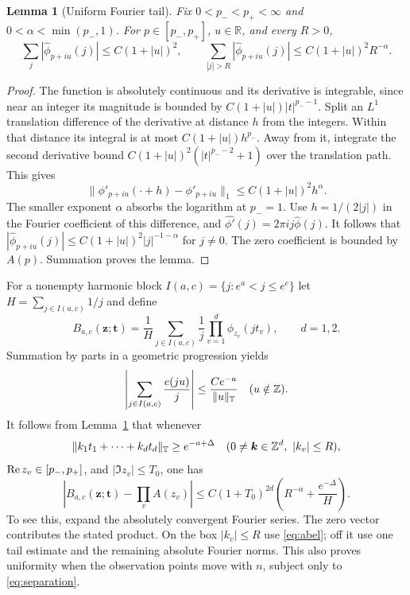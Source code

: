 \documentclass[11pt]{article}
\newtheorem{lemma}[theorem]{Lemma}
\theoremstyle{definition}\newtheorem{definition}[theorem]{Definition}
\theoremstyle{remark}\newtheorem{remark}[theorem]{Remark}
\newcommand{\T}{\mathbb T}\newcommand{\R}{\mathbb R}\newcommand{\C}{\mathbb C}
\numberwithin{equation}{section}\allowdisplaybreaks
\begin{document}
\begin{lemma}[Uniform Fourier tail]\label{lem:fourier}
Fix $0<p_-<p_+<\infty$ and $0<\alpha<\min(p_-,1)$. For
$p\in[p_-,p_+]$, $u\in\R$, and every $R>0$,
\begin{equation}\label{eq:fourier-tail}
 \sum_j|\widehat\phi_{p+iu}(j)|\le C(1+|u|)^2,
 \qquad
 \sum_{|j|>R}|\widehat\phi_{p+iu}(j)|
 \le C(1+|u|)^2 R^{-\alpha}.
\end{equation}
\end{lemma}
\begin{proof}
The function is absolutely continuous and its derivative is integrable,
since near an integer its magnitude is bounded by
$C(1+|u|)|t|^{p_--1}$. Split an $L^1$ translation difference of the
derivative at distance $h$ from the integers. Within that distance its
integral is at most $C(1+|u|)h^{p_-}$. Away from it, integrate the second
derivative bound $C(1+|u|)^2(|t|^{p_--2}+1)$ over the translation path.
This gives
\[
 \|\phi'_{p+iu}(\cdot+h)-\phi'_{p+iu}\|_1
 \le C(1+|u|)^2 h^\alpha.
\]
The smaller exponent $\alpha$ absorbs the logarithm at $p_-=1$.
Use $h=1/(2|j|)$ in the Fourier coefficient of this difference, and
$\widehat{\phi'}(j)=2\pi ij\widehat\phi(j)$. It follows that
$|\widehat\phi_{p+iu}(j)|\le C(1+|u|)^2|j|^{-1-\alpha}$ for $j\ne0$.
The zero coefficient is bounded by $A(p)$. Summation proves the lemma.
\end{proof}

For a nonempty harmonic block $I(a,c)=\{j:e^a<j\le e^c\}$ let
$H=\sum_{j\in I(a,c)}1/j$ and define
\[
 B_{a,c}(\boldsymbol z;\boldsymbol t)
 =\frac1H\sum_{j\in I(a,c)}\frac1j
                   \prod_{v=1}^d\phi_{z_v}(jt_v),\qquad d=1,2.
\]
Summation by parts in a geometric progression yields
\begin{equation}\label{eq:abel}
 \left|\sum_{j\in I(a,c)}\frac{e(ju)}j\right|
       \le\frac{Ce^{-a}}{\|u\|_\T}\quad(u\notin\Z).
\end{equation}
It follows from Lemma~\ref{lem:fourier} that whenever
\begin{equation}\label{eq:separation}
 \|k_1t_1+\cdots+k_dt_d\|_\T\ge e^{-a+\Delta}
 \quad(0\ne\boldsymbol k\in\Z^d,\ |k_v|\le R),
\end{equation}
$\operatorname{Re} z_v\in[p_-,p_+]$, and $|\Im z_v|\le T_0$, one has
\begin{equation}\label{eq:B-error}
 \left|B_{a,c}(\boldsymbol z;\boldsymbol t)-\prod_v A(z_v)\right|
 \le C(1+T_0)^{2d}\left(R^{-\alpha}+\frac{e^{-\Delta}}H\right).
\end{equation}
To see this, expand the absolutely convergent Fourier series. The zero
vector contributes the stated product. On the box $|k_v|\le R$ use
\eqref{eq:abel}; off it use one tail estimate and the remaining absolute
Fourier norms. This also proves uniformity when the observation points
move with $n$, subject only to \eqref{eq:separation}.
\end{document}
